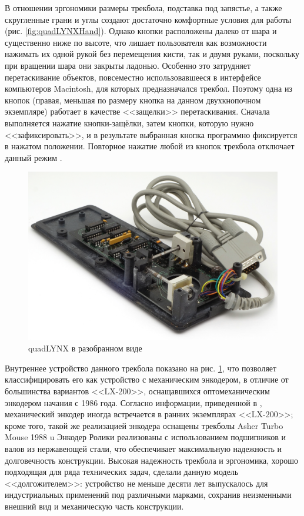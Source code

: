 \documentclass[11pt, a4paper]{article}
\begin{document}
В отношении эргономики размеры трекбола, подставка под запястье, а также скругленные грани и углы создают достаточно комфортные условия для работы (рис. \ref{fig:quadLYNXHand}). Однако кнопки расположены далеко от шара и существенно ниже по высоте, что лишает пользователя как возможности нажимать их одной рукой без перемещения кисти, так и двумя руками, поскольку при вращении шара они закрыты ладонью. Особенно это затрудняет перетаскивание объектов, повсеместно использовавшееся в интерфейсе компьютеров Macintosh, для которых предназначался трекбол. Поэтому одна из кнопок (правая, меньшая по размеру кнопка на данном двухкнопочном экземпляре) работает в качестве <<защелки>> перетаскивания. Сначала выполняется нажатие кнопки-защёлки, затем кнопки, которую нужно <<зафиксировать>>, и в результате выбранная кнопка программно фиксируется в нажатом положении. Повторное нажатие любой из кнопок трекбола отключает данный режим \cite{bible}.

\begin{figure}[h]
    \centering
    \includegraphics[scale=0.52]{1986_honeywell_asher_quadlynx_trackball/inside_30.jpg}
    \caption{quadLYNX в разобранном виде}
    \label{fig:quadLYNXInside}
\end{figure}

Внутреннее устройство данного трекбола показано на рис. \ref{fig:quadLYNXInside}, что позволяет классифицировать его как устройство с механическим энкодером, в отличие от большинства вариантов <<LX-200>>, оснащавшихся оптомеханическим энкодером начания с 1986 года. Согласно информации, приведенной в \cite{lx200}, механический энкодер иногда встречается в ранних экземплярах <<LX-200>>;  кроме того, такой же реализацией энкодера оснащены трекболы Asher Turbo Mouse 1988 u  Энкодер 
Ролики реализованы с использованием подшипников и валов из нержавеющей стали, что обеспечивает максимальную надежность и долговечность конструкции. Высокая надежность трекбола и эргономика, хорошо подходящая для ряда технических задач, сделали данную модель <<долгожителем>>: устройство не меньше десяти лет выпускалось для индустриальных применений под различными марками, сохранив неизменными внешний вид и механическую часть конструкции.
\end{document}
